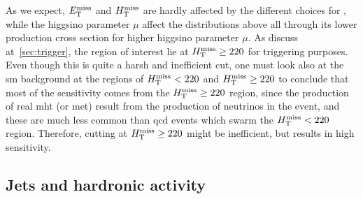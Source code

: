 As we expect, $E_{\mathrm{T}}^{\text{miss}}$ and $H_{\mathrm{T}}^{\text{miss}}$ are hardly affected by the different choices for \dm, while the higgsino parameter $\mu$ affect the distributions above all through its lower production cross section for higher higgsino parameter $\mu$. As discuss at~\ref{sec:trigger}, the region of interest lie at $H_{\mathrm{T}}^{\text{miss}}\geq 220$ for triggering purposes. Even though this is quite a harsh and inefficient cut, one must look also at the \gls{sm} background at the regions of $H_{\mathrm{T}}^{\text{miss}} < 220$ and $H_{\mathrm{T}}^{\text{miss}}\geq 220$ to conclude that most of the sensitivity comes from the $H_{\mathrm{T}}^{\text{miss}}\geq 220$ region, since the production of real \gls{mht} (or \gls{met}) result from the production of neutrinos in the event, and these are much less common than \gls{qcd} events which swarm the $H_{\mathrm{T}}^{\text{miss}} < 220$ region. Therefore, cutting at $H_{\mathrm{T}}^{\text{miss}}\geq 220$ might be inefficient, but results in high sensitivity. 

\subsection{Jets and hardronic activity}

